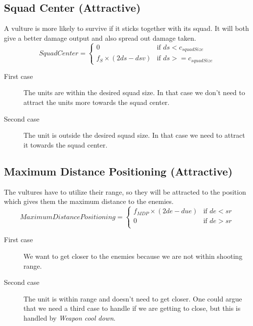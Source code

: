 	\subsection{Squad Center (Attractive)}
		\label{SCA_label}A vulture is more likely to survive if it sticks together with its squad. 
		It will both give a better damage output and also spread out damage taken.
		\begin{displaymath}
			SquadCenter  = \begin{cases}
					0 & \text{if } ds < c_{squadSize} \\
					f_{S} \times (2ds - dsv) & \text{if } ds >= c_{squadSize}
				\end{cases}		
		\end{displaymath}
		
		\begin{description}
			\item[First case] The units are within the desired squad size. In that case we don't need to attract the units more towards the squad center.
			\item[Second case] The unit is outside the desired squad size. In that case we need to attract it towards the squad center.
		\end{description}
	\subsection{Maximum Distance Positioning (Attractive)}
		The vultures have to utilize their range, so they will be attracted to the position which gives them the maximum distance to the enemies.
		\begin{displaymath}
			MaximumDistancePositioning = \begin{cases}
					f_{MDP} \times (2de - due) & \text{if } de < sr\\
					0 & \text{if } de > sr\\
				\end{cases}		
		\end{displaymath}
		\begin{description}
			\item[First case] We want to get closer to the enemies because we are not within shooting range.
			\item[Second case] The unit is within range and doesn't need to get closer. One could argue that we need a third case to handle if we are getting to close, but this is handled by \textit{Weapon cool down}.
		\end{description}
		\pagebreak
